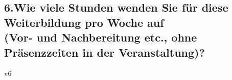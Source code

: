 \subsection*{6.Wie viele Stunden wenden Sie für diese Weiterbildung pro Woche auf \\ (Vor- und Nachbereitung etc., ohne Präsenzzeiten in der Veranstaltung)?}
\vspace{.5cm}
\begin{questionmult}{v6}
	\begin{choiceshoriz}
	\end{choiceshoriz}
\end{questionmult}
